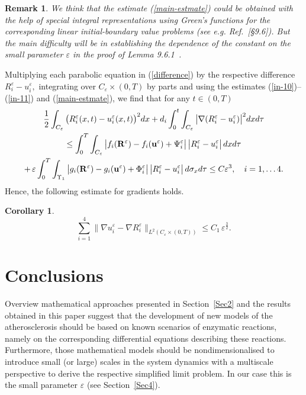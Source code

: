 \documentclass[reqno]{amsart}            %
\newtheorem{corollary}{Corollary}[section]
\newtheorem{remark}{Remark}[section]
\numberwithin{equation}{section}
\begin{document}
\begin{remark}
We think that the estimate (\ref{main-estmate}) could be obtained with the help of special integral representations using Green's functions for the corresponding linear initial-boundary value problems (see e.g. Ref.~\cite{Pao}[\S 9.6]). But the main difficulty will be
in establishing the dependence of the constant on the small parameter $\varepsilon$ in the proof of Lemma 9.6.1~\cite{Pao}.
\end{remark}

Multiplying each parabolic equation in (\ref{difference}) by the respective difference $R_i^\varepsilon - u^\varepsilon_i,$ integrating over $C_\varepsilon\times(0,T)$ by parts
and using the estimates (\ref{in-10})--(\ref{in-11}) and (\ref{main-estmate}), we find that for any $t\in (0, T)$
\begin{gather}
\frac12 \int_{C_{\varepsilon}} \big(R^\varepsilon_i(x,t) -  u^\varepsilon_i(x,t) \big)^2 dx
+
d_i \int_0^t \int_{C_{\varepsilon}} \big|\nabla(R^\varepsilon_i -  u^\varepsilon_i)\big|^2dx d\tau \notag
\\
  \le \int_0^T\int_{C_{\varepsilon}}\big| f_i({\bf R}^\varepsilon) - f_i({\bf u}^\varepsilon) + \Psi^\varepsilon_i \big|\,
  \big| R^\varepsilon_i -  u^\varepsilon_i \big| \, dx d\tau \notag
  \\+\,
  \varepsilon \int_0^T\int_{\Upsilon_1}\big| g_i({\bf R}^\varepsilon) - g_i({\bf u}^\varepsilon) + \Phi^\varepsilon_i \big|\, \big| R^\varepsilon_i -  u^\varepsilon_i\big|\,  d\sigma_x d\tau \le C \varepsilon^3, \quad i=1,\ldots4. \label{ine-1}
\end{gather}
Hence, the following estimate for gradients holds.
 \begin{corollary}\label{energy estimate}
 $$
\sum_{i=1}^4
\big\| \nabla u^\varepsilon_i -  \nabla R^\varepsilon_i  \big\|_{L^2(C_\varepsilon\times(0,T))}  \le C_1 \, \varepsilon^\frac32.
$$
\end{corollary}

\section{Conclusions}\label{Sec5}

Overview mathematical approaches  presented in Section~\ref{Sec2}  and the results obtained in this paper suggest that the development of new models of the atherosclerosis should be based on known scenarios of enzymatic reactions, namely on the corresponding differential equations describing these reactions. Furthermore, those mathematical models should be  nondimensionalised to introduce small (or large) scales in the system dynamics with a multiscale perspective to derive the respective simplified limit problem. In our case this is the small parameter $\varepsilon$ (see Section~\ref{Sec4}).
\end{document}
